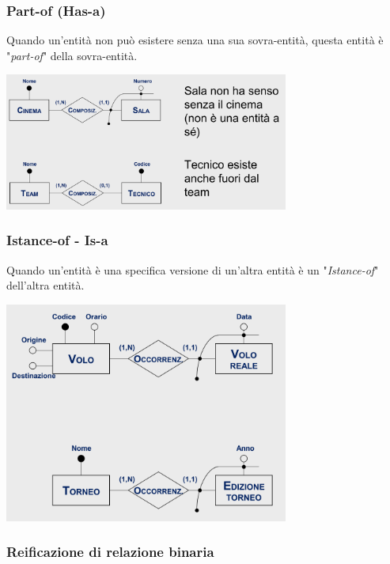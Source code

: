 \subsubsection{Part-of (Has-a)}
Quando un'entità non può esistere senza una sua sovra-entità, questa entità è "\textit{part-of}" della sovra-entità.

\begin{center}
    \includegraphics[width=0.7\textwidth]{img/partOf.png}
\end{center}

\subsubsection{Istance-of - Is-a}

Quando un'entità è una specifica versione di un'altra entità è un "\textit{Istance-of}" dell'altra entità.

\begin{center}
    \includegraphics[width=0.7\textwidth]{img/istanceOf.png}
\end{center}

\subsubsection{Reificazione di relazione binaria}

